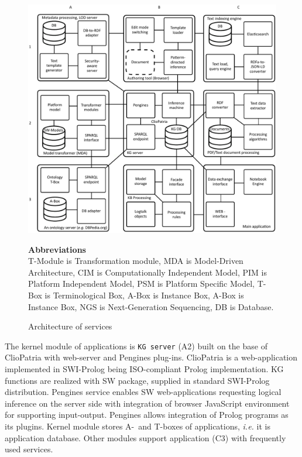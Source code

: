 \documentclass[
]{ceurart}
\begin{document}
\begin{figure}[bth]
  \begin{center}
    \includegraphics[width=0.9\linewidth]{architecture-mda-lod-ext-general.pdf}
  \end{center}
  \begin{center}
      \textbf{Abbreviations}\\[1ex]\scriptsize
      T-Module is Transformation module,
      MDA is Model-Driven Architecture,
      CIM is Computationally Independent Model,
      PIM is Platform Independent Model,
      PSM is Platform Specific Model,
      T-Box is Terminological Box,
      A-Box is Instance Box,
      A-Box is Instance Box,
      NGS is Next-Generation Sequencing,
      DB is Database.
  \end{center}

  \caption{Architecture of services}
  \label{fig:arch-services}
\end{figure}

The kernel module of applications is \texttt{KG server} (A2) built on the base of ClioPatria \cite{cliopatria} with web-server and Pengines plug-ins.  ClioPatria is a web-application implemented in SWI-Prolog \cite{swi} being ISO-compliant Prolog implementation.  KG functions are realized with SW package, supplied in standard SWI-Prolog distribution.  Pengines service enables SW web-applications requesting logical inference on the server side \cite{pengines} with integration of browser JavaScript environment for supporting input-output.  Pengines allows integration of Prolog programs as its plugins.  Kernel module stores A-~and T-boxes of applications, \emph{i.e.} it is application database.  Other modules support application (C3) with frequently used services.
\end{document}
